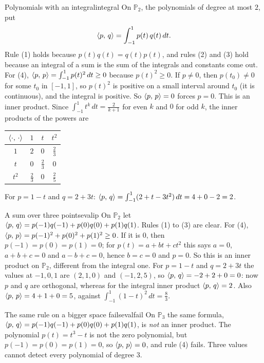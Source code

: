 \documentclass[11pt]{article}
\begin{document}
\begin{exmp}{Polynomials with an integral}{integral}
On $\mathbb{P}_2$, the polynomials of degree at most $2$, put
\[
\langle p,\,q\rangle=\int_{-1}^{1}p(t)\,q(t)\,dt .
\]
Rule (1) holds because $p(t)q(t)=q(t)p(t)$, and rules (2) and (3) hold because an integral of a sum is the sum of the integrals and constants come out. For (4), $\langle p,\,p\rangle=\int_{-1}^1p(t)^2\,dt\ge0$ because $p(t)^2\ge0$. If $p\neq0$, then $p(t_0)\neq0$ for some $t_0$ in $[-1,1]$, so $p(t)^2$ is positive on a small interval around $t_0$ (it is continuous), and the integral is positive. So $\langle p,\,p\rangle=0$ forces $p=0$. This is an inner product. Since $\int_{-1}^1t^k\,dt=\frac{2}{k+1}$ for even $k$ and $0$ for odd $k$, the inner products of the powers are
\begin{center}
\begin{tabular}{c|ccc}
$\langle \cdot,\,\cdot\rangle$ & $1$ & $t$ & $t^2$\\ \hline
$1$ & $2$ & $0$ & $\tfrac23$\\
$t$ & $0$ & $\tfrac23$ & $0$\\
$t^2$ & $\tfrac23$ & $0$ & $\tfrac25$
\end{tabular}
\end{center}
For $p=1-t$ and $q=2+3t$: $\langle p,\,q\rangle=\int_{-1}^1(2+t-3t^2)\,dt=4+0-2=2$.
\end{exmp}

\begin{exmp}{A sum over three points}{evalip}
On $\mathbb{P}_2$ let $\langle p,\,q\rangle=p(-1)q(-1)+p(0)q(0)+p(1)q(1)$. Rules (1) to (3) are clear. For (4), $\langle p,\,p\rangle=p(-1)^2+p(0)^2+p(1)^2\ge0$. If it is $0$, then $p(-1)=p(0)=p(1)=0$; for $p(t)=a+bt+ct^2$ this says $a=0$, $a+b+c=0$ and $a-b+c=0$, hence $b=c=0$ and $p=0$. So this is an inner product on $\mathbb{P}_2$, different from the integral one. For $p=1-t$ and $q=2+3t$ the values at $-1,0,1$ are $(2,1,0)$ and $(-1,2,5)$, so $\langle p,\,q\rangle=-2+2+0=0$: now $p$ and $q$ are orthogonal, whereas for the integral inner product $\langle p,\,q\rangle=2$. Also $\langle p,\,p\rangle=4+1+0=5$, against $\int_{-1}^1(1-t)^2\,dt=\tfrac83$.
\end{exmp}

\begin{exmp}{The same rule on a bigger space fails}{evalfail}
On $\mathbb{P}_3$ the same formula, $\langle p,\,q\rangle=p(-1)q(-1)+p(0)q(0)+p(1)q(1)$, is \emph{not} an inner product. The polynomial $p(t)=t^3-t$ is not the zero polynomial, but $p(-1)=p(0)=p(1)=0$, so $\langle p,\,p\rangle=0$, and rule (4) fails. Three values cannot detect every polynomial of degree $3$.
\end{exmp}
\end{document}
